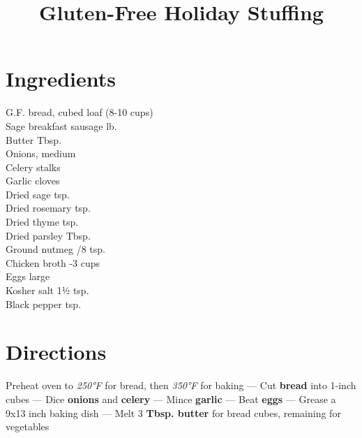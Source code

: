 \documentclass[11pt,letterpaper]{article}
\title{Gluten-Free Holiday Stuffing}
\author{}
\date{}
\begin{document}
\maketitle
\thispagestyle{empty}

\section*{Ingredients}
\setlength{\columnsep}{20pt}
\begin{multicols}{2}
\noindent
    G.F. bread, cubed  loaf (8-10 cups) \\
    Sage breakfast sausage  lb. \\
    Butter  Tbsp. \\
    Onions, medium  \\
    Celery stalks  \\
    Garlic cloves  \\
    \columnbreak
    Dried sage  tsp. \\
    Dried rosemary  tsp. \\
    Dried thyme  tsp. \\
    Dried parsley  Tbsp. \\
    Ground nutmeg /8 tsp. \\
    Chicken broth -3 cups \\
    Eggs  large \\
    Kosher salt \dotfill 1½ tsp. \\
    Black pepper  tsp.
\end{multicols}

\section*{Directions}

\noindent
Preheat oven to \textit{250°F} for bread, then \textit{350°F} for baking ---
Cut \textbf{bread} into 1-inch cubes ---
Dice \textbf{onions} and \textbf{celery} ---
Mince \textbf{garlic} ---
Beat \textbf{eggs} ---
Grease a 9x13 inch baking dish ---
Melt 3 \textbf{Tbsp. butter} for bread cubes, remaining for vegetables
\end{document}
